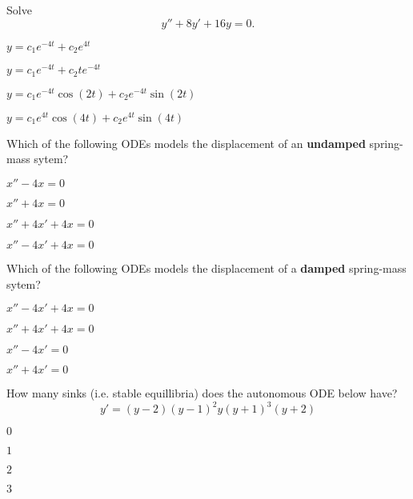 \begin{readinessAssuranceTest}
\vfill
\item Solve \[y''+8y'+16y=0.\]
\begin{multicols}{2}
\begin{readinessAssuranceTestChoices}
\item \(y=c_1 e^{-4t}+c_2 e^{4t}\) 
\item \(y=c_1 e^{-4t}+c_2 te^{-4t}\) %
\item \(y=c_1 e^{-4t}\cos(2t)+c_2e^{-4t}\sin(2t)\) 
\item \(y=c_1 e^{4t}\cos(4t)+c_2e^{4t}\sin(4t)\) 
\end{readinessAssuranceTestChoices}
\end{multicols}
\vfill

\newpage
\item %
Which of the following ODEs models the displacement of an \textbf{undamped} spring-mass sytem?
\begin{multicols}{4}
\begin{readinessAssuranceTestChoices}
\item \(x''-4x=0\)
\item \(x''+4x=0\) %
\item \(x''+4x'+4x=0\) 
\item \(x''-4x'+4x=0\) 
\end{readinessAssuranceTestChoices}
\end{multicols}
\vfill

\item Which of the following ODEs models the displacement of a \textbf{damped} spring-mass sytem?
\begin{multicols}{4}
\begin{readinessAssuranceTestChoices}
\item \(x''-4x'+4x=0\) 
\item \(x''+4x'+4x=0\) %
\item \(x''-4x'=0\)
\item \(x''+4x'=0\) 
\end{readinessAssuranceTestChoices}
\end{multicols}

\vfill
\item %
How many sinks (i.e. stable equillibria) does the autonomous ODE below have?
\[ y'=(y-2)(y-1)^2y(y+1)^3(y+2)\]
\begin{multicols}{4}
\begin{readinessAssuranceTestChoices}
\item \(0\) 
\item \(1\)
\item \(2\) %
\item \(3\) 
\end{readinessAssuranceTestChoices}
\end{multicols}
\vfill


\end{readinessAssuranceTest}

